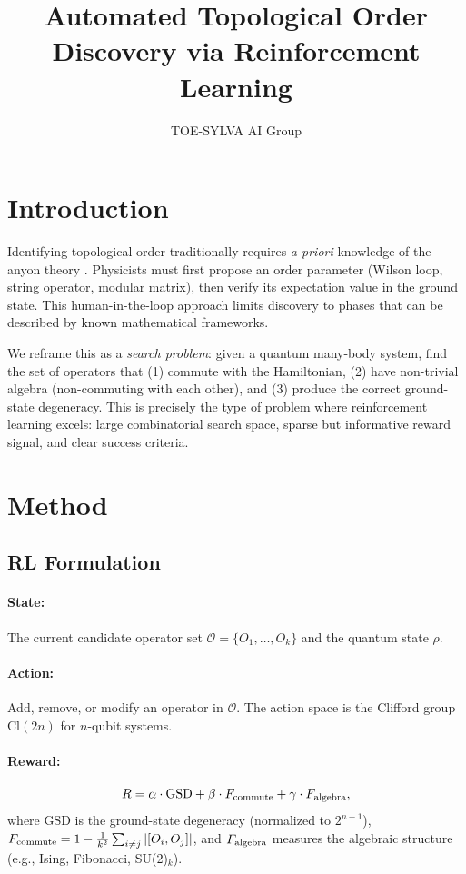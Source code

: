 \documentclass[neurips_2026]{neurips_2026}
\title{Automated Topological Order Discovery via Reinforcement Learning}
\author{TOE-SYLVA AI Group}
\begin{document}
\maketitle

\section{Introduction}
\label{sec:intro}

Identifying topological order \cite{Wen1990} traditionally requires \emph{a priori} knowledge of the anyon theory \cite{Kitaev2006}. Physicists must first propose an order parameter (Wilson loop, string operator, modular matrix), then verify its expectation value in the ground state. This human-in-the-loop approach limits discovery to phases that can be described by known mathematical frameworks.

We reframe this as a \emph{search problem}: given a quantum many-body system, find the set of operators that (1) commute with the Hamiltonian, (2) have non-trivial algebra (non-commuting with each other), and (3) produce the correct ground-state degeneracy. This is precisely the type of problem where reinforcement learning excels: large combinatorial search space, sparse but informative reward signal, and clear success criteria.

\section{Method}
\label{sec:method}

\subsection{RL Formulation}

\paragraph{State:} The current candidate operator set $\mathcal{O} = \{O_1, \ldots, O_k\}$ and the quantum state $\rho$.

\paragraph{Action:} Add, remove, or modify an operator in $\mathcal{O}$. The action space is the Clifford group $\mathrm{Cl}(2n)$ for $n$-qubit systems.

\paragraph{Reward:}
\begin{equation}
R = \alpha \cdot \mathrm{GSD} + \beta \cdot F_{\rm commute} + \gamma \cdot F_{\rm algebra},
\end{equation}
where GSD is the ground-state degeneracy (normalized to $2^{n-1}$), $F_{\rm commute} = 1 - \frac{1}{k^2}\sum_{i \neq j} |[O_i, O_j]|$, and $F_{\rm algebra}$ measures the algebraic structure (e.g., Ising, Fibonacci, SU(2)$_k$).
\end{document}
